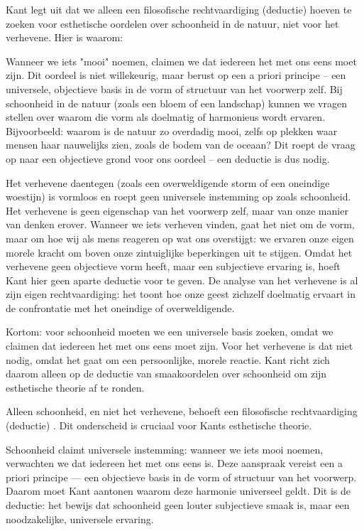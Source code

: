 \begin{mdframed}[leftmargin=0pt,rightmargin=0pt,backgroundcolor=blue!6,linecolor=white,innertopmargin=6pt,innerbottommargin=6pt]

Kant legt uit dat we alleen een filosofische rechtvaardiging (deductie) hoeven te zoeken voor esthetische oordelen over schoonheid in de natuur, niet voor het verhevene. Hier is waarom:

Wanneer we iets "mooi" noemen, claimen we dat iedereen het met ons eens moet zijn. Dit oordeel is niet willekeurig, maar berust op een a priori principe – een universele, objectieve basis in de vorm of structuur van het voorwerp zelf. Bij schoonheid in de natuur (zoals een bloem of een landschap) kunnen we vragen stellen over waarom die vorm als doelmatig of harmonieus wordt ervaren. Bijvoorbeeld: waarom is de natuur zo overdadig mooi, zelfs op plekken waar mensen haar nauwelijks zien, zoals de bodem van de oceaan? Dit roept de vraag op naar een objectieve grond voor ons oordeel – een deductie is dus nodig.

Het verhevene daentegen (zoals een overweldigende storm of een oneindige woestijn) is vormloos en roept geen universele instemming op zoals schoonheid. Het verhevene is geen eigenschap van het voorwerp zelf, maar van onze manier van denken erover. Wanneer we iets verheven vinden, gaat het niet om de vorm, maar om hoe wij als mens reageren op wat ons overstijgt: we ervaren onze eigen morele kracht om boven onze zintuiglijke beperkingen uit te stijgen. Omdat het verhevene geen objectieve vorm heeft, maar een subjectieve ervaring is, hoeft Kant hier geen aparte deductie voor te geven. De analyse van het verhevene is al zijn eigen rechtvaardiging: het toont hoe onze geest zichzelf doelmatig ervaart in de confrontatie met het oneindige of overweldigende.

Kortom: voor schoonheid moeten we een universele basis zoeken, omdat we claimen dat iedereen het met ons eens moet zijn. Voor het verhevene is dat niet nodig, omdat het gaat om een persoonlijke, morele reactie. Kant richt zich daarom alleen op de deductie van smaakoordelen over schoonheid om zijn esthetische theorie af te ronden.

\bigskip
Alleen schoonheid, en niet het verhevene, behoeft een filosofische rechtvaardiging (deductie) . Dit onderscheid is cruciaal voor Kants esthetische theorie.

Schoonheid claimt universele instemming: wanneer we iets mooi noemen, verwachten we dat iedereen het met ons eens is. Deze aanspraak vereist een a priori principe — een objectieve basis in de vorm of structuur van het voorwerp. Daarom moet Kant aantonen waarom deze harmonie universeel geldt. Dit is de deductie: het bewijs dat schoonheid geen louter subjectieve smaak is, maar een noodzakelijke, universele ervaring.


\end{mdframed}
